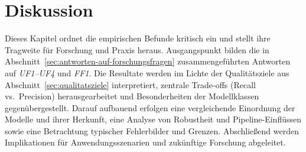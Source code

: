 \chapter{Diskussion}\label{ch:diskussion}

Dieses Kapitel ordnet die empirischen Befunde kritisch ein und stellt ihre Tragweite für Forschung und Praxis heraus. Ausgangspunkt bilden die in Abschnitt~\ref{sec:antworten-auf-forschungsfragen} zusammengeführten Antworten auf \emph{UF1–UF4} und \emph{FF1}. Die Resultate werden im Lichte der Qualitätsziele aus Abschnitt~\ref{sec:qualitatsziele} interpretiert, zentrale Trade-offs (Recall vs.\ Precision) herausgearbeitet und Besonderheiten der Modellklassen gegenübergestellt. Darauf aufbauend erfolgen eine vergleichende Einordnung der Modelle und ihrer Herkunft, eine Analyse von Robustheit und Pipeline-Einflüssen sowie eine Betrachtung typischer Fehlerbilder und Grenzen. Abschließend werden Implikationen für Anwendungsszenarien und zukünftige Forschung abgeleitet.









